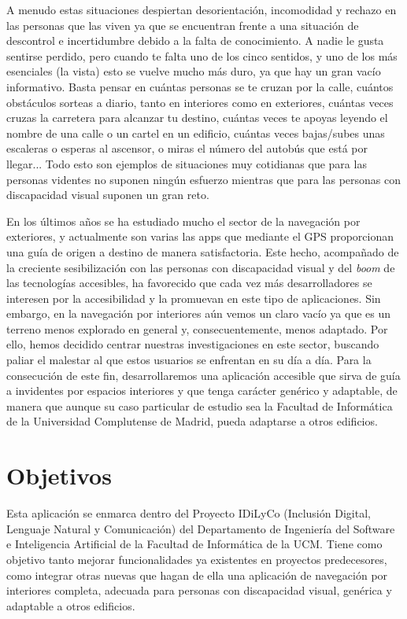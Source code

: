 A menudo estas situaciones despiertan desorientación, incomodidad y rechazo en las personas que las viven ya que se encuentran frente a una situación de descontrol e incertidumbre debido a la falta de conocimiento. A nadie le gusta sentirse perdido, pero cuando te falta uno de los cinco sentidos, y uno de los más esenciales (la vista) esto se vuelve mucho más duro, ya que hay un gran vacío informativo. Basta pensar en cuántas personas se te cruzan por la calle, cuántos obstáculos sorteas a diario, tanto en interiores como en exteriores, cuántas veces cruzas la carretera para alcanzar tu destino, cuántas veces te apoyas leyendo el nombre de una calle o un cartel en un edificio, cuántas veces bajas/subes unas escaleras o esperas al ascensor, o miras el número del autobús que está por llegar... Todo esto son ejemplos de situaciones muy cotidianas que para las personas videntes no suponen ningún esfuerzo mientras que para las personas con discapacidad visual suponen un gran reto. 

En los últimos años se ha estudiado mucho el sector de la navegación por exteriores, y actualmente son varias las apps que mediante el GPS proporcionan una guía de origen a destino de manera satisfactoria. Este hecho, acompañado de la creciente sesibilización con las personas con discapacidad visual y del \textit{boom} de las tecnologías accesibles, ha favorecido que cada vez más desarrolladores se interesen por la accesibilidad y la promuevan en este tipo de aplicaciones. Sin embargo, en la navegación por interiores aún vemos un claro vacío ya que es un terreno menos explorado en general y, consecuentemente, menos adaptado. Por ello, hemos decidido centrar nuestras investigaciones en este sector, buscando paliar el malestar al que estos usuarios se enfrentan en su día a día. Para la consecución de este fin, desarrollaremos una aplicación accesible que sirva de guía a invidentes por espacios interiores y que tenga carácter genérico y adaptable, de manera que aunque su caso particular de estudio sea la Facultad de Informática de la Universidad Complutense de Madrid, pueda adaptarse a otros edificios. 


\section{Objetivos}

Esta aplicación se enmarca dentro del Proyecto IDiLyCo (Inclusión Digital, Lenguaje Natural y Comunicación) del Departamento de
Ingeniería del Software e Inteligencia Artificial de la Facultad de Informática de la UCM. Tiene
como objetivo tanto mejorar funcionalidades ya existentes en proyectos predecesores, como integrar otras nuevas que hagan de ella una aplicación de navegación por interiores completa, adecuada para personas con discapacidad visual, genérica y adaptable a otros edificios.

